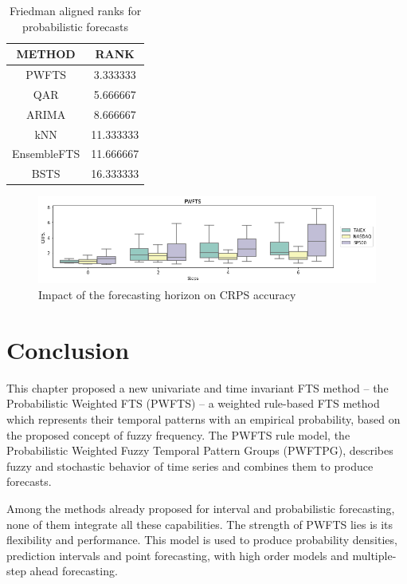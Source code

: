 \begin{table}[hbt]
    \centering
    \begin{tabular}{|c|c|}
\hline
       METHOD &       RANK \\
\hline
PWFTS &   3.333333 \\
QAR &   5.666667 \\
ARIMA &   8.666667 \\
kNN &  11.333333 \\
EnsembleFTS &  11.666667 \\
BSTS &  16.333333 \\ \hline
\end{tabular}
    \caption{Friedman aligned ranks for probabilistic forecasts }
    \label{tab:pwfts_probabilistic_ranks}
\end{table}

\begin{figure}[htb]
    \centering
    \includegraphics[width=\textwidth]{figures/pwfts_ahead_probabilistic.png}
    \caption{Impact of the forecasting horizon on CRPS accuracy}
    \label{fig:pwfts_ahead_probabilistic}
\end{figure}

\section{Conclusion}
\label{sec:pwfts_conclusion}

This chapter proposed a new univariate and time invariant FTS method -- the Probabilistic Weighted FTS (PWFTS) -- a weighted rule-based FTS method which represents their temporal patterns with an empirical probability,  based on the proposed concept of fuzzy frequency. The PWFTS rule model, the Probabilistic Weighted Fuzzy Temporal Pattern Groups (PWFTPG), describes fuzzy and stochastic behavior of time series and combines them to produce forecasts. 

Among the methods already proposed for interval and probabilistic forecasting, none of them integrate all these capabilities. The strength of PWFTS lies is its flexibility and performance. This model is used to produce probability densities, prediction intervals and point forecasting, with high order models and multiple-step ahead forecasting.  

